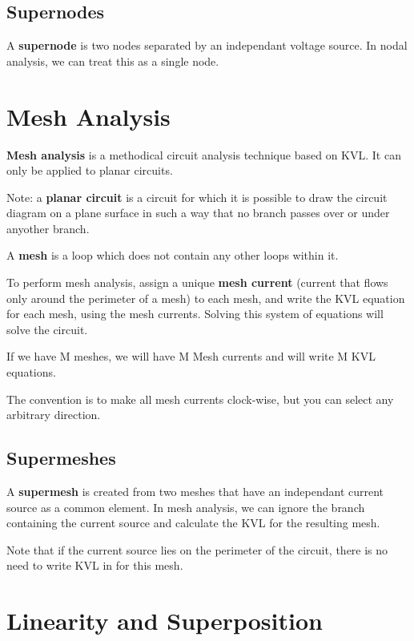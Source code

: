 \documentclass[12pt]{article}
\begin{document}
\subsection*{Supernodes}
A {\bf supernode} is two nodes separated by an independant voltage source. In nodal analysis, we can treat this as a single node.

\section*{Mesh Analysis}
{\bf Mesh analysis} is a methodical circuit analysis technique based on KVL. It can only be applied to planar circuits.

Note: a {\bf planar circuit} is a circuit for which it is possible to draw the circuit diagram on a plane surface in such a way that no branch passes over or under anyother branch.

A {\bf mesh} is a loop which does not contain any other loops within it.

To perform mesh analysis, assign a unique {\bf mesh current} (current that flows only around the perimeter of a mesh) to each mesh, and write the KVL equation for each mesh, using the mesh currents. Solving this system of equations will solve the circuit.

If we have M meshes, we will have M Mesh currents and will write M KVL equations.

The convention is to make all mesh currents clock-wise, but you can select any arbitrary direction.

\subsection*{Supermeshes}
A {\bf supermesh} is created from two meshes that have an independant current source as a common element. In mesh analysis, we can ignore the branch containing the current source and calculate the KVL for the resulting mesh.

Note that if the current source lies on the perimeter of the circuit, there is no need to write KVL in for this mesh.

\section*{Linearity and Superposition}
\end{document}
